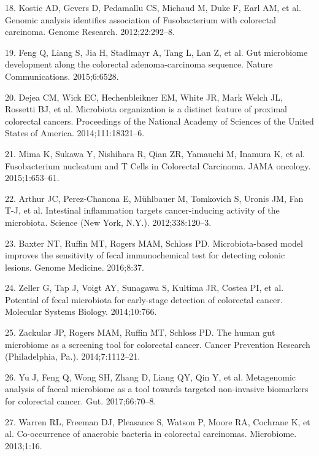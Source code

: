 \documentclass[12pt,]{article}
\begin{document}
\hypertarget{ref-kostic_genomic_2012}{}
18. Kostic AD, Gevers D, Pedamallu CS, Michaud M, Duke F, Earl AM, et
al. Genomic analysis identifies association of Fusobacterium with
colorectal carcinoma. Genome Research. 2012;22:292--8.

\hypertarget{ref-feng_gut_2015}{}
19. Feng Q, Liang S, Jia H, Stadlmayr A, Tang L, Lan Z, et al. Gut
microbiome development along the colorectal adenoma-carcinoma sequence.
Nature Communications. 2015;6:6528.

\hypertarget{ref-dejea_microbiota_2014}{}
20. Dejea CM, Wick EC, Hechenbleikner EM, White JR, Mark Welch JL,
Rossetti BJ, et al. Microbiota organization is a distinct feature of
proximal colorectal cancers. Proceedings of the National Academy of
Sciences of the United States of America. 2014;111:18321--6.

\hypertarget{ref-mima_fusobacterium_2015}{}
21. Mima K, Sukawa Y, Nishihara R, Qian ZR, Yamauchi M, Inamura K, et
al. Fusobacterium nucleatum and T Cells in Colorectal Carcinoma. JAMA
oncology. 2015;1:653--61.

\hypertarget{ref-arthur_intestinal_2012}{}
22. Arthur JC, Perez-Chanona E, Mühlbauer M, Tomkovich S, Uronis JM, Fan
T-J, et al. Intestinal inflammation targets cancer-inducing activity of
the microbiota. Science (New York, N.Y.). 2012;338:120--3.

\hypertarget{ref-baxter_microbiota-based_2016}{}
23. Baxter NT, Ruffin MT, Rogers MAM, Schloss PD. Microbiota-based model
improves the sensitivity of fecal immunochemical test for detecting
colonic lesions. Genome Medicine. 2016;8:37.

\hypertarget{ref-zeller_potential_2014}{}
24. Zeller G, Tap J, Voigt AY, Sunagawa S, Kultima JR, Costea PI, et al.
Potential of fecal microbiota for early-stage detection of colorectal
cancer. Molecular Systems Biology. 2014;10:766.

\hypertarget{ref-zackular_human_2014}{}
25. Zackular JP, Rogers MAM, Ruffin MT, Schloss PD. The human gut
microbiome as a screening tool for colorectal cancer. Cancer Prevention
Research (Philadelphia, Pa.). 2014;7:1112--21.

\hypertarget{ref-yu_metagenomic_2017}{}
26. Yu J, Feng Q, Wong SH, Zhang D, Liang QY, Qin Y, et al. Metagenomic
analysis of faecal microbiome as a tool towards targeted non-invasive
biomarkers for colorectal cancer. Gut. 2017;66:70--8.

\hypertarget{ref-warren_co-occurrence_2013}{}
27. Warren RL, Freeman DJ, Pleasance S, Watson P, Moore RA, Cochrane K,
et al. Co-occurrence of anaerobic bacteria in colorectal carcinomas.
Microbiome. 2013;1:16.
\end{document}
